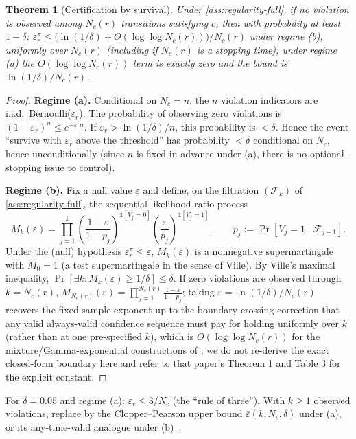 \documentclass[11pt]{article}
\theoremstyle{plain}
\newtheorem{theorem}{Theorem}[section]
\theoremstyle{definition}
\theoremstyle{remark}
\begin{document}
\begin{theorem}[Certification by survival]
\label{thm:t1-full}
Under \autoref{ass:regularity-full}, if no violation is observed among $N_c(r)$ transitions satisfying $c$, then with probability at least $1-\delta$: $\varepsilon^\pi_r \le \big(\ln(1/\delta)+O(\log\log N_c(r))\big)/N_c(r)$ under regime (b), uniformly over $N_c(r)$ (including if $N_c(r)$ is a stopping time); under regime (a) the $O(\log\log N_c(r))$ term is exactly zero and the bound is $\ln(1/\delta)/N_c(r)$.
\end{theorem}
\begin{proof}
\textbf{Regime (a).} Conditional on $N_c=n$, the $n$ violation indicators are i.i.d.\ Bernoulli($\varepsilon_r$). The probability of observing zero violations is $(1-\varepsilon_r)^n\le e^{-\varepsilon_r n}$. If $\varepsilon_r>\ln(1/\delta)/n$, this probability is $<\delta$. Hence the event ``survive with $\varepsilon_r$ above the threshold'' has probability $<\delta$ conditional on $N_c$, hence unconditionally (since $n$ is fixed in advance under (a), there is no optional-stopping issue to control).

\textbf{Regime (b).} Fix a null value $\varepsilon$ and define, on the filtration $(\mathcal{F}_k)$ of \autoref{ass:regularity-full}, the sequential likelihood-ratio process
$$M_k(\varepsilon) = \prod_{j=1}^{k}\left(\frac{1-\varepsilon}{1-p_j}\right)^{\mathbb{1}[V_j=0]}\left(\frac{\varepsilon}{p_j}\right)^{\mathbb{1}[V_j=1]}, \qquad p_j := \Pr[V_j=1\mid\mathcal{F}_{j-1}].$$
Under the (null) hypothesis $\varepsilon_r^\pi\le\varepsilon$, $M_k(\varepsilon)$ is a nonnegative supermartingale with $M_0=1$ (a test supermartingale in the sense of Ville). By Ville's maximal inequality, $\Pr[\exists k: M_k(\varepsilon)\ge 1/\delta]\le\delta$. If zero violations are observed through $k=N_c(r)$, $M_{N_c(r)}(\varepsilon)=\prod_{j=1}^{N_c(r)}\frac{1-\varepsilon}{1-p_j}$; taking $\varepsilon=\ln(1/\delta)/N_c(r)$ recovers the fixed-sample exponent up to the boundary-crossing correction that any valid always-valid confidence sequence must pay for holding uniformly over $k$ (rather than at one pre-specified $k$), which is $O(\log\log N_c(r))$ for the mixture/Gamma-exponential constructions of \citet{howard2020timeuniform}; we do not re-derive the exact closed-form boundary here and refer to that paper's Theorem 1 and Table 3 for the explicit constant.
\end{proof}
For $\delta=0.05$ and regime (a): $\varepsilon_r\le 3/N_c$ (the ``rule of three''). With $k\ge1$ observed violations, replace by the Clopper--Pearson upper bound $\bar\varepsilon(k,N_c,\delta)$ under (a), or its any-time-valid analogue under (b)~\citep{howard2020timeuniform}.
\end{document}
